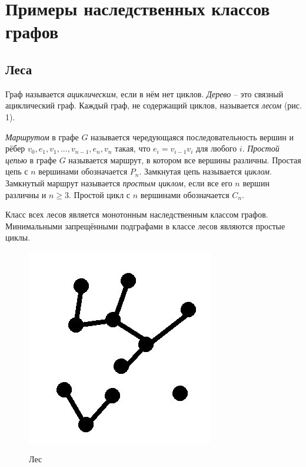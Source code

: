 \documentclass[12pt]{article}
\begin{document}
\section{Примеры наследственных классов графов}


\subsection{Леса}
Граф называется {\it ациклическим}, если в нём нет циклов. {\it Дерево} -- это связный ациклический граф. Каждый граф, не содержащий циклов, называется {\it лесом} (рис. 1).

{\it Маршрутом} в графе $G$ называется чередующаяся последовательность вершин и рёбер $v_0, e_1, v_1, ... , v_{n-1}, e_n, v_n$ такая, что $e_i=v_{i-1}v_i$ для любого $i$. %
{\it Простой цепью} в графе $G$ называется маршрут, в котором все вершины различны. Простая цепь с $n$ вершинами обозначается $P_n$.
Замкнутая цепь называется {\it циклом}. Замкнутый маршрут называется {\it простым циклом}, если все его $n$ вершин различны и $n \geq 3$. Простой цикл с $n$ вершинами обозначается $C_n$.

Класс всех лесов является монотонным наследственным классом графов. Минимальными запрещёнными подграфами в классе лесов являются простые циклы.

\begin{figure}
\begin{center}
	\label{pic1}
	\includegraphics[scale=0.33]{les.jpg}
	\caption{Лес}
\end{center}
\end{figure}
\vspace{-3mm} 
\end{document}
